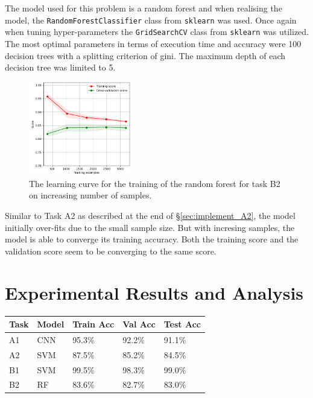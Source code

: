 \documentclass{article}
\begin{document}
	    The model used for this problem is a random forest and when realising the model, the \texttt{RandomForestClassifier} class from \texttt{sklearn} was used. Once again when tuning hyper-parameters the \texttt{GridSearchCV} class from \texttt{sklearn} was utilized. The most optimal parameters in terms of execution time and accuracy were 100 decision trees with a splitting criterion of gini. The maximum depth of each decision tree was limited to 5.
	    \\
	    
	    \begin{figure}[htb]
	    	\centering
	    	\includegraphics[width=0.4\textwidth]{b2_learning_curve.png}
	    	\caption{The learning curve for the training of the random forest for task B2 on increasing number of samples.}
	    	\label{fig:b2_leraning_curve}
	    \end{figure}
	    
	    Similar to Task A2 as described at the end of \S \ref{sec:implement_A2}, the model initially over-fits due to the small sample size. But with incresing samples, the model is able to converge its training accuracy. Both the training score and the validation score seem to be converging to the same score.

\section{Experimental Results and Analysis}
\label{sec:experimental_results}

	\begin{table}[H]
		\centering
		\label{table:Table1}
		\begin{tabular}{@{}lllll@{}}
			\toprule
			Task & Model & Train Acc & Val Acc & Test Acc \\ \midrule
			A1   & CNN   & 95.3\%    & 92.2\%  & 91.1\%   \\
			A2   & SVM   & 87.5\%    & 85.2\%  & 84.5\%   \\
			B1   & SVM   & 99.5\%    & 98.3\%  & 99.0\%   \\
			B2   & RF    & 83.6\%    & 82.7\%  & 83.0\%   \\ \bottomrule
		\end{tabular}
	\end{table}
    
\end{document}
